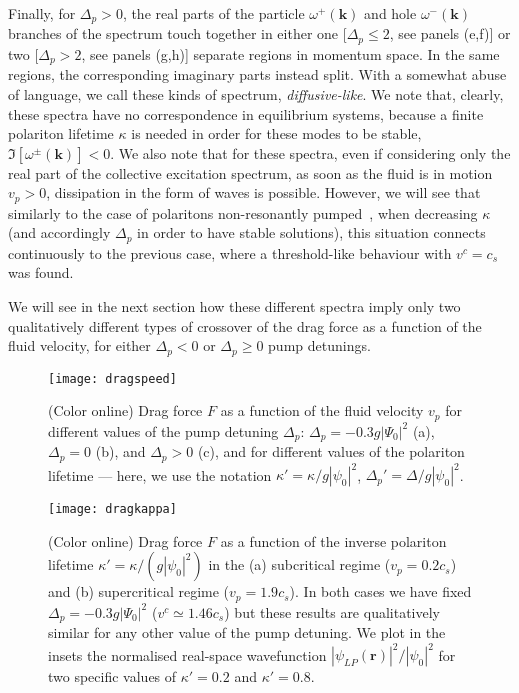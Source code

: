 Finally, for $\Delta_p>0$, the real parts of the particle $\omega^+
(\bm{k})$ and hole $\omega^- (\bm{k})$ branches of the spectrum
touch together in either one [$\Delta_p \le 2$, see panels (e,f)] or
two [$\Delta_p > 2$, see panels (g,h)] separate regions in momentum
space. In the same regions, the corresponding imaginary parts instead
split. With a somewhat abuse of language, we call these kinds of
spectrum, \emph{diffusive-like}. We note that, clearly, these spectra
have no correspondence in equilibrium systems, because a finite
polariton lifetime $\kappa$ is needed in order for these modes to be
stable, $\Im [ \omega^{\pm} (\bm{k}) ]<0$. We also note that for
these spectra, even if considering only the real part of the
collective excitation spectrum, as soon as the fluid is in motion
$v_p>0$, dissipation in the form of waves is possible. However, we
will see that similarly to the case of polaritons non-resonantly
pumped~\cite{Wouters_2010}, when decreasing $\kappa$ (and accordingly
$\Delta_p$ in order to have stable solutions), this situation connects
continuously to the previous case, where a threshold-like behaviour
with $v^c = c_s$ was found.


We will see in the next section how these different spectra imply only
two qualitatively different types of crossover of the drag force as a
function of the fluid velocity, for either $\Delta_p<0$ or $\Delta_p
\ge 0$ pump detunings.

%
\begin{figure}[tb]\centering
\texttt{[image: dragspeed]} %
\caption{
%
(Color online) Drag force $F$ as a function of the fluid velocity
$v_p$ for different values of the pump detuning $\Delta_p$:
$\Delta_p=-0.3g|\Psi_0|^2$ (a), $\Delta_p=0$ (b), and $\Delta_p>0$
(c), and for different values of the polariton lifetime --- here, we
use the notation $\kappa' = \kappa/g|\psi_0|^2$, $\Delta_p' =
\Delta/g|\psi_0|^2$.
%
}\label{fig:dragv}
\end{figure}
%
%
\begin{figure}[tb]\centering
\texttt{[image: dragkappa]} %
\caption{
%
(Color online) Drag force $F$ as a function of the inverse polariton
lifetime $\kappa'=\kappa/(g |\psi_0|^2)$ in the (a) subcritical regime
($v_p=0.2 c_s$) and (b) supercritical regime ($v_p=1.9 c_s$). In both
cases we have fixed $\Delta_p=-0.3g|\Psi_0|^2$ ($v^c \simeq 1.46 c_s$)
but these results are qualitatively similar for any other value of the
pump detuning. We plot in the insets the normalised real-space
wavefunction $|\psi_{LP}(\bm{r})|^2/|\psi_0|^2$ for two specific
values of $\kappa'=0.2$ and $\kappa'=0.8$.
%
}\label{fig:dragk}
\end{figure}
%


